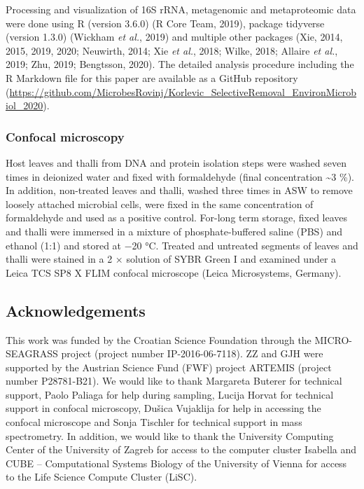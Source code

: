 \documentclass[12pt,]{article}
\begin{document}
Processing and visualization of 16S rRNA, metagenomic and metaproteomic
data were done using R (version 3.6.0) (R Core Team, 2019), package
tidyverse (version 1.3.0) (Wickham \emph{et al.}, 2019) and multiple
other packages (Xie, 2014, 2015, 2019, 2020; Neuwirth, 2014; Xie
\emph{et al.}, 2018; Wilke, 2018; Allaire \emph{et al.}, 2019; Zhu,
2019; Bengtsson, 2020). The detailed analysis procedure including the R
Markdown file for this paper are available as a GitHub repository
(\url{https://github.com/MicrobesRovinj/Korlevic_SelectiveRemoval_EnvironMicrobiol_2020}).

\hypertarget{confocal-microscopy}{%
\subsubsection{Confocal microscopy}\label{confocal-microscopy}}

Host leaves and thalli from DNA and protein isolation steps were washed
seven times in deionized water and fixed with formaldehyde (final
concentration \textasciitilde{}3 \si{\percent}). In addition,
non-treated leaves and thalli, washed three times in ASW to remove
loosely attached microbial cells, were fixed in the same concentration
of formaldehyde and used as a positive control. For-long term storage,
fixed leaves and thalli were immersed in a mixture of phosphate-buffered
saline (PBS) and ethanol (1:1) and stored at \num{-20}
\si{\degreeCelsius}. Treated and untreated segments of leaves and thalli
were stained in a 2 × solution of SYBR Green I and examined under a
Leica TCS SP8 X FLIM confocal microscope (Leica Microsystems, Germany).

\hypertarget{acknowledgements}{%
\subsection{Acknowledgements}\label{acknowledgements}}

This work was funded by the Croatian Science Foundation through the
MICRO-SEAGRASS project (project number IP-2016-06-7118). ZZ and GJH were
supported by the Austrian Science Fund (FWF) project ARTEMIS (project
number P28781-B21). We would like to thank Margareta Buterer for
technical support, Paolo Paliaga for help during sampling, Lucija Horvat
for technical support in confocal microscopy, Dušica Vujaklija for help
in accessing the confocal microscope and Sonja Tischler for technical
support in mass spectrometry. In addition, we would like to thank the
University Computing Center of the University of Zagreb for access to
the computer cluster Isabella and CUBE -- Computational Systems Biology
of the University of Vienna for access to the Life Science Compute
Cluster (LiSC).
\end{document}
